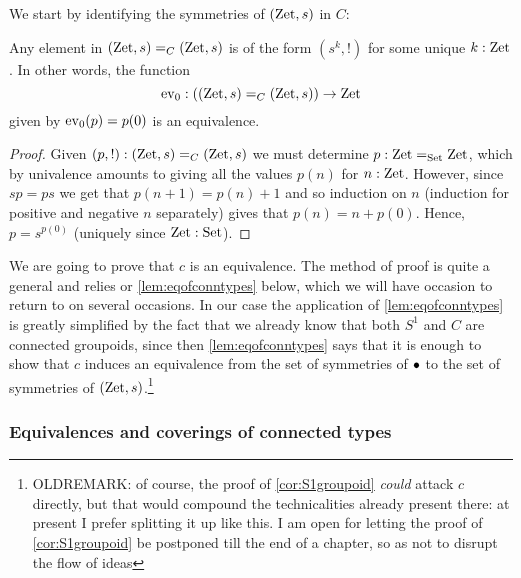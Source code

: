 We start by identifying the symmetries of $(\mathrm{Zet},s)$ in $C$:

\begin{lemma}
  \label{lem:IdCisZet}
  Any element in $(\mathrm{Zet},s)=_C(\mathrm{Zet},s)$ is of the form $(s^k,!)$ for some unique $k:\mathrm{Zet}$.  In other words,
  the function 
$$\mathrm{ev}_0:((\mathrm{Zet},s)=_C(\mathrm{Zet},s))\to \mathrm{Zet}$$ given by $\mathrm{ev}_0(p)=p(0)$ is an equivalence.
\end{lemma}
\begin{proof}
  Given $(p,!):(\mathrm{Zet},s)=_C(\mathrm{Zet},s)$ we must determine $p:\mathrm{Zet}=_{\mathord{\mathrm{Set}}}\mathrm{Zet}$, which by univalence amounts to giving all the values $p(n)$ for $n:\mathrm{Zet}$.  However, since $sp=ps$ we get that $p(n+1)=p(n)+1$ and so induction on $n$ (induction for positive and negative $n$ separately) gives that $p(n)=n+p(0)$.  Hence, $p=s^{p(0)}$ (uniquely since $\mathrm{Zet}:\mathord{\mathrm{Set}}$).
\end{proof}

We are going to prove that $c$ is an equivalence.  The method of proof is quite a general and relies or  \cref{lem:eqofconntypes} below, which we will have occasion to return to on several occasions.  In our case the application of  \cref{lem:eqofconntypes} is greatly simplified by the fact that we already know that both $S^1$ and $C$ are connected groupoids, since then \cref{lem:eqofconntypes} says that it is enough to show that $c$ induces an equivalence from the set of symmetries of $\bullet$ to the set of symmetries of $(\mathrm{Zet},s)$.\footnote{OLDREMARK: of course, the proof of \cref{cor:S1groupoid} \emph{could} attack $c$ directly, but that would compound the technicalities already present there: at present I prefer splitting it up like this.  I am open for letting the proof of \cref{cor:S1groupoid} be postponed till the end of a chapter, so as not to disrupt the flow of ideas}


\subsubsection{Equivalences and coverings of connected types}
\label{sec:eqconntypes}

